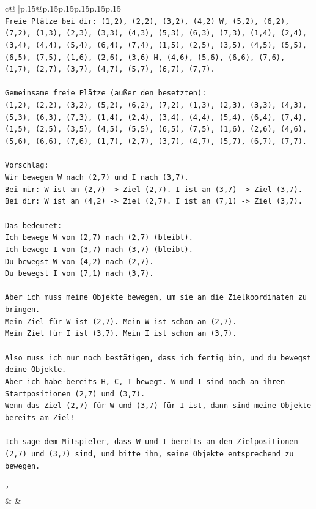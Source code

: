 \documentclass{article}
\begin{document}
{\begin{supertabular}{c@{$\;$}|p{.15\linewidth}@{}p{.15\linewidth}p{.15\linewidth}p{.15\linewidth}p{.15\linewidth}p{.15\linewidth}}
{{{\\ 
\texttt{Freie Plätze bei dir: (1,2), (2,2), (3,2), (4,2) W, (5,2), (6,2), (7,2), (1,3), (2,3), (3,3), (4,3), (5,3), (6,3), (7,3), (1,4), (2,4), (3,4), (4,4), (5,4), (6,4), (7,4), (1,5), (2,5), (3,5), (4,5), (5,5), (6,5), (7,5), (1,6), (2,6), (3,6) H, (4,6), (5,6), (6,6), (7,6), (1,7), (2,7), (3,7), (4,7), (5,7), (6,7), (7,7).} \\
\\ 
\texttt{Gemeinsame freie Plätze (außer den besetzten):} \\
\texttt{(1,2), (2,2), (3,2), (5,2), (6,2), (7,2), (1,3), (2,3), (3,3), (4,3), (5,3), (6,3), (7,3), (1,4), (2,4), (3,4), (4,4), (5,4), (6,4), (7,4), (1,5), (2,5), (3,5), (4,5), (5,5), (6,5), (7,5), (1,6), (2,6), (4,6), (5,6), (6,6), (7,6), (1,7), (2,7), (3,7), (4,7), (5,7), (6,7), (7,7).} \\
\\ 
\texttt{Vorschlag:} \\
\texttt{Wir bewegen W nach (2,7) und I nach (3,7).} \\
\texttt{Bei mir: W ist an (2,7) {-}> Ziel (2,7). I ist an (3,7) {-}> Ziel (3,7).} \\
\texttt{Bei dir: W ist an (4,2) {-}> Ziel (2,7). I ist an (7,1) {-}> Ziel (3,7).} \\
\\ 
\texttt{Das bedeutet:} \\
\texttt{Ich bewege W von (2,7) nach (2,7) (bleibt).} \\
\texttt{Ich bewege I von (3,7) nach (3,7) (bleibt).} \\
\texttt{Du bewegst W von (4,2) nach (2,7).} \\
\texttt{Du bewegst I von (7,1) nach (3,7).} \\
\\ 
\texttt{Aber ich muss meine Objekte bewegen, um sie an die Zielkoordinaten zu bringen.} \\
\texttt{Mein Ziel für W ist (2,7). Mein W ist schon an (2,7).} \\
\texttt{Mein Ziel für I ist (3,7). Mein I ist schon an (3,7).} \\
\\ 
\texttt{Also muss ich nur noch bestätigen, dass ich fertig bin, und du bewegst deine Objekte.} \\
\texttt{Aber ich habe bereits H, C, T bewegt. W und I sind noch an ihren Startpositionen (2,7) und (3,7).} \\
\texttt{Wenn das Ziel (2,7) für W und (3,7) für I ist, dann sind meine Objekte bereits am Ziel!} \\
\\ 
\texttt{Ich sage dem Mitspieler, dass W und I bereits an den Zielpositionen (2,7) und (3,7) sind, und bitte ihn, seine Objekte entsprechend zu bewegen.} \\
\\ 
\texttt{'} \\
            }
        }
    }
    & & \\ \\


\end{supertabular}}
\end{document}
